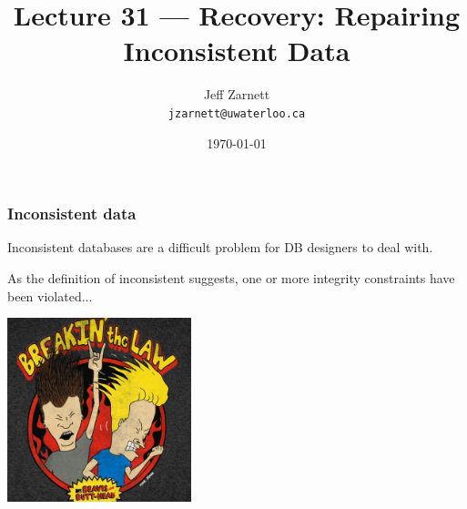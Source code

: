 

\title{Lecture 31 --- Recovery: Repairing Inconsistent Data}

\author{Jeff Zarnett \\ \small \texttt{jzarnett@uwaterloo.ca}}
\date{\today}




\begin{frame}
  \titlepage

 \end{frame}


\begin{frame}
\frametitle{Inconsistent data}

Inconsistent databases are a difficult problem for DB designers to deal with. 

As the definition of inconsistent suggests, one or more integrity constraints have been violated... 

\begin{center}
	\includegraphics[width=0.4\textwidth]{images/breakingthelaw.jpg}
\end{center}


 \end{frame}


